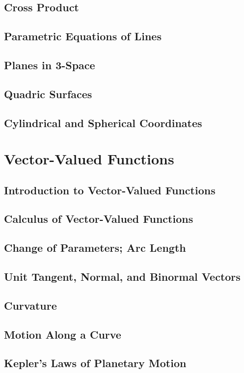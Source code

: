 \documentclass[]{article}
\begin{document}
\subsection{Cross Product}
\subsection{Parametric Equations of Lines}
\subsection{Planes in 3-Space}
\subsection{Quadric Surfaces}
\subsection{Cylindrical and Spherical Coordinates}
\section{Vector-Valued Functions}
\subsection{Introduction to Vector-Valued Functions}
\subsection{Calculus of Vector-Valued Functions}
\subsection{Change of Parameters; Arc Length}
\subsection{Unit Tangent, Normal, and Binormal Vectors}
\subsection{Curvature}
\subsection{Motion Along a Curve}
\subsection{Kepler's Laws of Planetary Motion}
\end{document}
